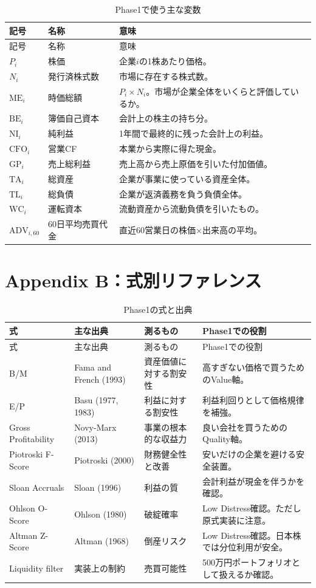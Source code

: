 \documentclass[11pt,a4paper]{article}
\newcommand{\BE}{\mathrm{BE}}
\newcommand{\ME}{\mathrm{ME}}
\newcommand{\NI}{\mathrm{NI}}
\newcommand{\TA}{\mathrm{TA}}
\newcommand{\TL}{\mathrm{TL}}
\newcommand{\GP}{\mathrm{GP}}
\newcommand{\CFO}{\mathrm{CFO}}
\newcommand{\WC}{\mathrm{WC}}
\newcommand{\ADV}{\mathrm{ADV}}
\begin{document}
\begin{longtable}{p{30mm}p{34mm}p{78mm}}
\caption{Phase1で使う主な変数}\label{tab:variables}\\
\toprule
記号 & 名称 & 意味 \\
\midrule
\endfirsthead
\toprule
記号 & 名称 & 意味 \\
\midrule
\endhead
$P_i$ & 株価 & 企業$i$の1株あたり価格。 \\
$N_i$ & 発行済株式数 & 市場に存在する株式数。 \\
$\ME_i$ & 時価総額 & $P_i\times N_i$。市場が企業全体をいくらと評価しているか。 \\
$\BE_i$ & 簿価自己資本 & 会計上の株主の持ち分。 \\
$\NI_i$ & 純利益 & 1年間で最終的に残った会計上の利益。 \\
$\CFO_i$ & 営業CF & 本業から実際に得た現金。 \\
$\GP_i$ & 売上総利益 & 売上高から売上原価を引いた付加価値。 \\
$\TA_i$ & 総資産 & 企業が事業に使っている資産全体。 \\
$\TL_i$ & 総負債 & 企業が返済義務を負う負債全体。 \\
$\WC_i$ & 運転資本 & 流動資産から流動負債を引いたもの。 \\
$\ADV_{i,60}$ & 60日平均売買代金 & 直近60営業日の株価×出来高の平均。 \\
\bottomrule
\end{longtable}

\clearpage
\section{Appendix B：式別リファレンス}

\begin{longtable}{p{25mm}p{38mm}p{30mm}p{63mm}}
\caption{Phase1の式と出典}\label{tab:references-formula}\\
\toprule
式 & 主な出典 & 測るもの & Phase1での役割 \\
\midrule
\endfirsthead
\toprule
式 & 主な出典 & 測るもの & Phase1での役割 \\
\midrule
\endhead
B/M & Fama and French (1993) & 資産価値に対する割安性 & 高すぎない価格で買うためのValue軸。 \\
E/P & Basu (1977, 1983) & 利益に対する割安性 & 利益利回りとして価格規律を補強。 \\
Gross Profitability & Novy-Marx (2013) & 事業の根本的な収益力 & 良い会社を買うためのQuality軸。 \\
Piotroski F-Score & Piotroski (2000) & 財務健全性と改善 & 安いだけの企業を避ける安全装置。 \\
Sloan Accruals & Sloan (1996) & 利益の質 & 会計利益が現金を伴うかを確認。 \\
Ohlson O-Score & Ohlson (1980) & 破綻確率 & Low Distress確認。ただし原式実装に注意。 \\
Altman Z-Score & Altman (1968) & 倒産リスク & Low Distress確認。日本株では分位利用が安全。 \\
Liquidity filter & 実装上の制約 & 売買可能性 & 500万円ポートフォリオとして扱えるか確認。 \\
\bottomrule
\end{longtable}
\end{document}
